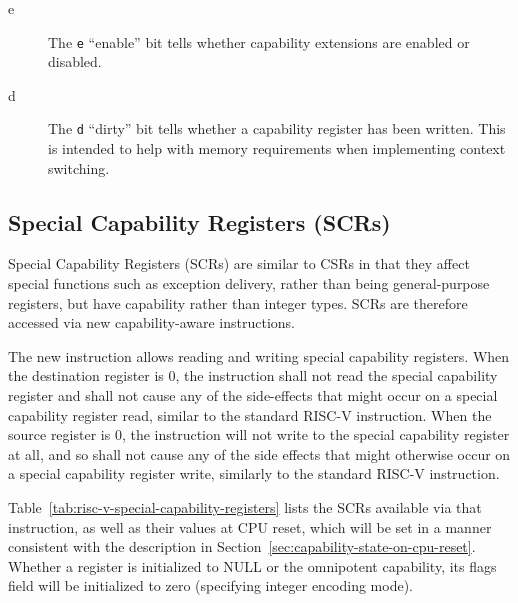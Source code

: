 \begin{description}
\item [e] The \texttt{e} ``enable'' bit  tells whether capability extensions are enabled or disabled.
\item [d] The \texttt{d} ``dirty'' bit tells whether a capability register has been written. This is intended to help with memory requirements when implementing context switching.  
\end{description}

\subsection{Special Capability Registers (SCRs)}
\label{subsection:cheri-riscv-scrs}

Special Capability Registers (SCRs) are similar to CSRs in that they affect
special functions such as exception delivery, rather than being
general-purpose registers, but have capability rather than integer types.
SCRs are therefore accessed via new capability-aware instructions.

The new  instruction allows reading and writing special
capability registers. When the destination register is 0, the instruction shall
not read the special capability register and shall not cause any of the
side-effects that might occur on a special capability register read, similar to
the standard  RISC-V instruction. When the source register is 0, the
instruction will not write to the special capability register at all, and so
shall not cause any of the side effects that might otherwise occur on a special
capability register write, similarly to the standard  RISC-V
instruction.

Table~\ref{tab:risc-v-special-capability-registers} lists the SCRs
available via that instruction, as well as their values at CPU reset, which
will be set in a manner consistent with the description in
Section~\ref{sec:capability-state-on-cpu-reset}.
Whether a register is initialized to NULL or the omnipotent capability, its
flags field will be initialized to zero (specifying integer encoding mode).

